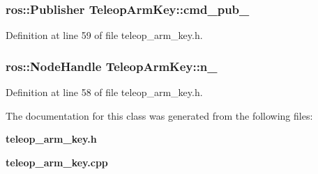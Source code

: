 \subsubsection[{cmd\-\_\-pub\-\_\-}]{\setlength{\rightskip}{0pt plus 5cm}ros\-::\-Publisher {\bf \-Teleop\-Arm\-Key\-::cmd\-\_\-pub\-\_\-}\hspace{0.3cm}{\ttfamily  [private]}}\label{classTeleopArmKey_a4af07ab0f477cee06bc8355376e9d6f8}


\-Definition at line 59 of file teleop\-\_\-arm\-\_\-key.\-h.

\subsubsection[{n\-\_\-}]{\setlength{\rightskip}{0pt plus 5cm}ros\-::\-Node\-Handle {\bf \-Teleop\-Arm\-Key\-::n\-\_\-}\hspace{0.3cm}{\ttfamily  [private]}}\label{classTeleopArmKey_a23af94e76d98494d2e2ee989179ee48d}


\-Definition at line 58 of file teleop\-\_\-arm\-\_\-key.\-h.



\-The documentation for this class was generated from the following files\-:\begin{DoxyCompactItemize}
\item 
{\bf teleop\-\_\-arm\-\_\-key.\-h}\item 
{\bf teleop\-\_\-arm\-\_\-key.\-cpp}\end{DoxyCompactItemize}
